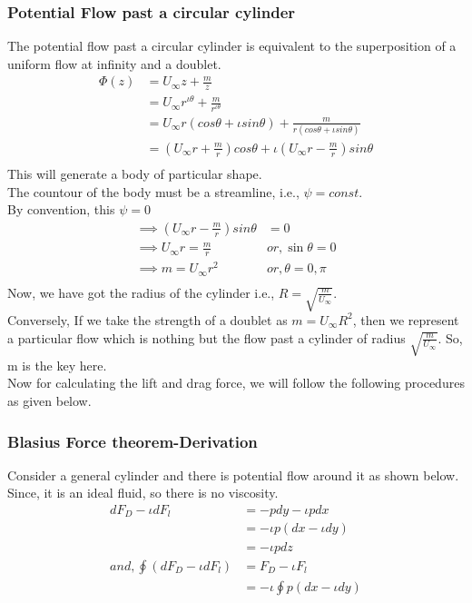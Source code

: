 \documentclass{book}
\begin{document}
\subsubsection{Potential Flow past a circular cylinder}
The potential flow past a circular cylinder is equivalent to the superposition of a uniform flow at infinity and a doublet.
\begin{equation*}
\begin{split}
\Phi(z)&=U_\infty z + \frac{m}{z} \\
         &=U_\infty r^{\iota \theta}+\frac{m}{r^{\iota \theta} }\\
         &=U_\infty r({cos{\theta}+\iota sin{\theta}})  +  \frac{m}{r(cos{\theta}+\iota sin{\theta})}\\
         &=(U_\infty r+\frac{m}{r})cos{\theta} + \iota(U_\infty r- \frac{m}{r})sin{\theta} \\
\end{split}
\end{equation*}
This will generate a body of particular shape. \\
The countour of the body must be a streamline, i.e., $\psi=const$.\\
By convention, this $\psi=0$
\begin{equation*}
\begin{split}
\implies (U_\infty r- \frac{m}{r})sin{\theta} &=0 \\
\implies U_\infty r= \frac{m}{r} & or, \sin{\theta}=0 \\
\implies m=U_\infty r^2 & or, \theta=0, \pi \\
\end{split}
\end{equation*}
Now, we have got the radius of the cylinder i.e., $R=\sqrt{\frac{m}{U_\infty}}$. \\
Conversely, If we take the strength of a doublet as $m=U_\infty R^2$, then we represent a particular flow which is nothing but the flow past a cylinder of radius $\sqrt{\frac{m}{U_\infty}}$. So, m is the key here. \\
Now for calculating the lift and drag force, we will follow the following procedures as given below. 
\subsubsection{Blasius Force theorem-Derivation}
Consider a general cylinder and there is potential flow around it as shown below. Since, it is an ideal fluid, so there is no viscosity.
\begin{equation*}
\begin{split}
dF_D-\iota dF_l&=-pdy-\iota pdx \\
                      &=-\iota p(dx-\iota dy) \\
                      &=-\iota pdz \\
and, \oint (dF_D-\iota dF_l)&=F_D-\iota F_l \\
                                         &=-\iota \oint p(dx-\iota dy) 
\end{split}
\end{equation*}
\end{document}

